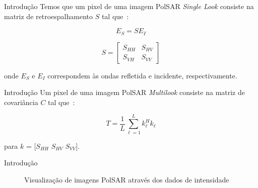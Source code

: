 \documentclass[10pt]{beamer}
\begin{document}
\begin{frame}{Introdução}
    Temos que um pixel de uma imagem PolSAR \textit{Single Look} consiste na matriz de retroespalhamento $S$ tal que~\cite{Pottier09}:
    
    \begin{equation}
        E_S = S E_I
    \end{equation}
    
    \begin{equation}
        S = 
        \begin{bmatrix}
            S_{HH} & S_{HV}\\
            S_{VH} & S_{VV}
        \end{bmatrix}
    \end{equation}
    
    onde $E_S$ e $E_I$ correspondem às ondas refletida e incidente, respectivamente.
\end{frame}

\begin{frame}{Introdução}
    Um pixel de uma imagem PolSAR \textit{Multilook} consiste na matriz de covariância $C$ tal que~\cite{Pottier09}:
    
    \begin{equation}
        T = \frac{1}{L} \sum_{\ell=1}^L k^H_{\ell} k_{\ell} 
    \end{equation}
    
    para $k$ = [$S_{HH}$ $S_{HV}$  $S_{VV}$].
\end{frame}

\begin{frame}{Introdução}
    
    \begin{figure}%
        \centering
        \qquad
        \caption{Visualização de imagens PolSAR através dos dados de intensidade}%
        \label{fig:mlc_and_slc_images}%
    \end{figure}
    
\end{frame}
\end{document}
